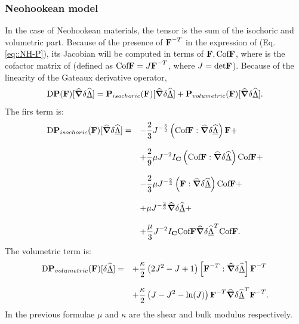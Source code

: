 \subsubsection{Neohookean model} In the case of Neohookean materials,
the tensor \Piola{} is the sum of the isochoric and volumetric
part. Because of the presence of $\textbf{F}^{-T}$ in the expression of \Piola{}
(Eq. \eqref{eq::NH-P}), its Jacobian will be computed in terms of
$\textbf{F},\text{Cof}\textbf{F}$, where \cofF{} is the cofactor matrix of \F{} (defined as
$\text{Cof}\textbf{F}=J\textbf{F}^{-T}$, where $J=\text{det}\textbf{F}$). Because of the linearity of
the Gateaux derivative operator,
\begin{equation}
  \text{D}\textbf{P}(\textbf{F})[\widehat{\boldsymbol{\nabla}}\delta\widehat{\underline{\Lambda}}]=\textbf{P}_{isochoric}(\textbf{F})[\widehat{\boldsymbol{\nabla}}\delta\widehat{\underline{\Lambda}}]+
  \textbf{P}_{volumetric}(\textbf{F})[\widehat{\boldsymbol{\nabla}}\delta\widehat{\underline{\Lambda}}].
\end{equation}
The firs term is:
\begin{equation}
  \begin{array}{llllllllllll}
    \text{D}\Piola_{isochoric}(\F)[\GradSpost] = & \displaystyle
    -\frac{2}{3}J^{-\frac{5}{3}}\left(\cofF:\GradSpost\right)\F +\\ \\ &
    \displaystyle + \frac{2}{9}\mu
    J^{-2}I_{\C}\left(\cofF:\GradSpost\right)\cofF + \\ \\ & \displaystyle
    - \frac{2}{3}\mu J^{-\frac{5}{3}}\left(\F:\GradSpost\right)\cofF + \\
    \\ & \displaystyle + \mu J^{-\frac{2}{3}}\GradSpost + \\ \\ &
    \displaystyle + \frac{\mu}{3}J^{-2}I_{\C}\cofF\GradSpost^T\cofF.
  \end{array}
  \label{eq::IsoPartDP-neo}
\end{equation}
The volumetric term is:
\begin{equation}
  \begin{array}{lll} \text{D}\Piola_{volumetric}(\F)[\delta\Spost] = &
    \displaystyle +
    \frac{\kappa}{2}\left(2J^2-J+1\right)\left[\F^{-T}:\GradSpost\right]
    \F^{-T}\\
    \\ & \displaystyle +
    \frac{\kappa}{2}\left(J-J^2-\text{ln}(J)\right)\F^{-T}\GradSpost^T\F^{-T}.\\
  \end{array}
  \label{eq::VolPartDP-neo}
\end{equation}
In the previous formulae $\mu$ and $\kappa$ are the
shear and bulk modulus respectively.

